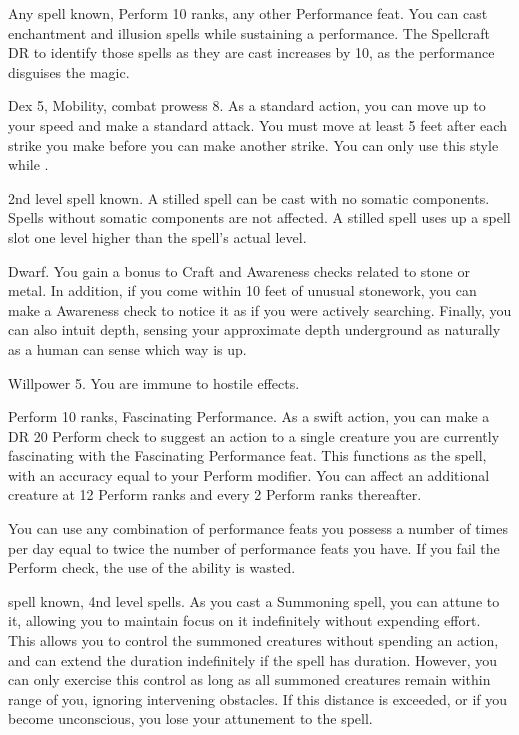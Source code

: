 \featpres Any spell known, Perform 10 ranks, any other Performance feat.
\featben You can cast enchantment and illusion spells while sustaining a performance.
The Spellcraft DR to identify those spells as they are cast increases by 10, as the performance disguises the magic.

\featpres Dex 5, Mobility, combat prowess 8.
\featben As a standard action, you can move up to your speed and make a standard attack.
You must move at least 5 feet after each strike you make before you can make another strike.
You can only use this style while \unencumbered.

\featpre 2nd level spell known.
\featben A stilled spell can be cast with no somatic components.
Spells without somatic components are not affected.
A stilled spell uses up a spell slot one level higher than the spell's actual level.

\featpre Dwarf.
\featben You gain a  bonus to Craft and Awareness checks related to stone or metal.
In addition, if you come within 10 feet of unusual stonework, you can make a Awareness check to notice it as if you were actively searching.
Finally, you can also intuit depth, sensing your approximate depth underground as naturally as a human can sense which way is up.

\featpre Willpower 5.
\featben You are immune to hostile  effects.

\featpres Perform 10 ranks, Fascinating Performance.
\featben As a swift action, you can make a DR 20 Perform check to suggest an action to a single creature you are currently fascinating with the Fascinating Performance feat.
This functions as the  spell, with an accuracy equal to your Perform modifier.
You can affect an additional creature at 12 Perform ranks and every 2 Perform ranks thereafter.

You can use any combination of performance feats you possess a number of times per day equal to twice the number of performance feats you have.
If you fail the Perform check, the use of the ability is wasted.

\featpre {} spell known, 4nd level spells.
\featben As you cast a Summoning spell, you can attune to it, allowing you to maintain focus on it indefinitely without expending effort.
This allows you to control the summoned creatures without spending an action, and can extend the duration indefinitely if the spell has \durshort duration.
However, you can only exercise this control as long as all summoned creatures remain within \rnglong range of you, ignoring intervening obstacles.
If this distance is exceeded, or if you become unconscious, you lose your attunement to the spell.

